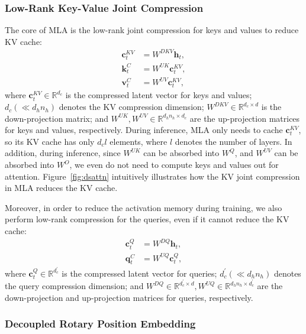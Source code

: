\documentclass[11pt, a4paper, logo, copyright, nonumbering]{deepseek}
\newcommand{\dsattn}{MLA}
\begin{document}
\begin{CJK*}{UTF8}{gbsn}
\subsubsection{Low-Rank Key-Value Joint Compression}

The core of \dsattn{} is the low-rank joint compression for keys and values to reduce KV cache:
\begin{align}
    \mathbf{c}_{t}^{KV} &= W^{DKV} \mathbf{h}_{t}, \\
    \label{eq:c_to_k}
    \mathbf{k}_{t}^{C} &= W^{UK} \mathbf{c}_{t}^{KV}, \\
    \mathbf{v}_{t}^{C} &= W^{UV} \mathbf{c}_{t}^{KV},
\end{align}
where $\mathbf{c}_{t}^{KV} \in \mathbb{R}^{d_c}$ is the compressed latent vector for keys and values; 
$d_c (\ll d_h n_h)$ denotes the KV compression dimension;
$W^{DKV} \in \mathbb{R}^{d_c \times d}$ is the down-projection matrix;
and $W^{UK},W^{UV} \in \mathbb{R}^{d_h n_h \times d_c}$ are the up-projection matrices for keys and values, respectively. 
During inference, \dsattn{} only needs to cache $\mathbf{c}_{t}^{KV}$, so its KV cache has only $d_{c}l$ elements, where $l$ denotes the number of layers. 
In addition, during inference, since $W^{UK}$ can be absorbed into $W^{Q}$, and $W^{UV}$ can be absorbed into $W^{O}$, we even do not need to compute keys and values out for attention. 
Figure~\ref{fig:dsattn} intuitively illustrates how the KV joint compression in \dsattn{} reduces the KV cache. 

Moreover, in order to reduce the activation memory during training, we also perform low-rank compression for the queries, even if it cannot reduce the KV cache:
\begin{align}
    \mathbf{c}_{t}^{Q} &= W^{DQ} \mathbf{h}_{t}, \\
    \mathbf{q}_{t}^{C} &= W^{UQ} \mathbf{c}_{t}^{Q},
\end{align}
where $\mathbf{c}_{t}^{Q} \in \mathbb{R}^{d_c^{\prime}}$ is the compressed latent vector for queries; 
$d_c^{\prime} (\ll d_h n_h)$ denotes the query compression dimension; 
and $W^{DQ} \in \mathbb{R}^{d_c^{\prime} \times d}, W^{UQ} \in \mathbb{R}^{d_h n_h \times d_c^{\prime}}$ are the down-projection and up-projection matrices for queries, respectively. 

\subsubsection{Decoupled Rotary Position Embedding}


\end{CJK*}
\end{document}
